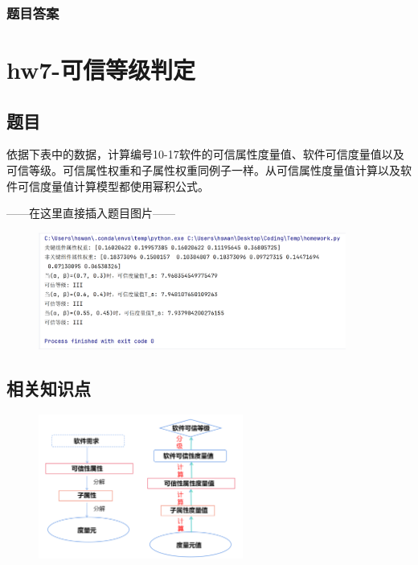 \documentclass{article}
\begin{document}
\subsubsection{题目答案}














\section{hw7-可信等级判定}

\subsection{题目}

依据下表中的数据，计算编号10-17软件的可信属性度量值、软件可信度量值以及可信等级。可信属性权重和子属性权重同例子一样。从可信属性度量值计算以及软件可信度量值计算模型都使用幂积公式。

——在这里直接插入题目图片——

\begin{figure}[H]
	\centering
	\includegraphics[width=0.9\textwidth]{img/1.png}
\end{figure}

\subsection{相关知识点}

\begin{figure}[H]
	\centering
	\includegraphics[width=0.6\textwidth]{img/static_1.png}
\end{figure}
\end{document}
